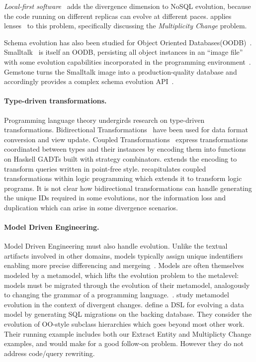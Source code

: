 \documentclass[english,submission]{programming}
\begin{document}
\emph{Local-first software}~\cite{localfirst} adds the divergence dimension to NoSQL evolution, because the code running on different replicas can evolve at different paces. \citet{Cambria} applies lenses~\cite{Foster2007} to this problem, specifically discussing the \emph{Multiplicity Change} problem.

Schema evolution has also been studied for Object Oriented Databases(OODB)~\cite{li99,banerjee87}. Smalltalk~\cite{Goldberg80} is itself an OODB, persisting all object instances in an ``image file'' with some evolution capabilities incorporated in the programming environment~\cite[pp.252-272]{Goldberg80}. Gemstone turns the Smalltalk image into a production-quality database and accordingly provides a complex schema evolution API~\cite{Gemstone}.

\paragraph{Type-driven transformations.}
Programming language theory undergirds research on type-driven transformations. Bidirectional Transformations~\cite{czarnecki2009bidirectional} have been used for data format conversion and view update.
Coupled Transformations~\cite{Berdaguer07, alcino06, Cleve2006} express transformations coordinated between types and their instances by encoding them into functions on Haskell GADTs built with strategy combinators. \citet{JVisser08} extends the encoding to transform queries written in point-free style. \citet{lammel16} recapitulates coupled transformations within logic programming which extends it to transform logic programs. It is not clear how bidirectional transformations can handle generating the unique IDs required in some evolutions, nor the information loss and duplication which can arise in some divergence scenarios.

\paragraph{Model Driven Engineering.}
Model Driven Engineering must also handle evolution. Unlike the textual artifacts involved in other domains, models typically assign unique indentifiers enabling more precise differencing and mergeing~\cite{alanen2003}.
Models are often themselves modeled by a metamodel, which lifts the evolution problem to the metalevel: models must be migrated through the evolution of their metamodel, analogously to changing the grammar of a programming language.~\cite{Herrmannsdoerfer11}. \citet{Cicchetti11} study metamodel evolution in the context of divergent changes.
\citet{vermolen11} define a DSL for evolving a data model by generating SQL migrations on the backing database. They consider the evolution of OO-style subclass hierarchies which goes beyond most other work. Their running example includes both our Extract Entity and Multiplicty Change examples, and would make for a good follow-on problem. However they do not address code/query rewriting.
\end{document}
